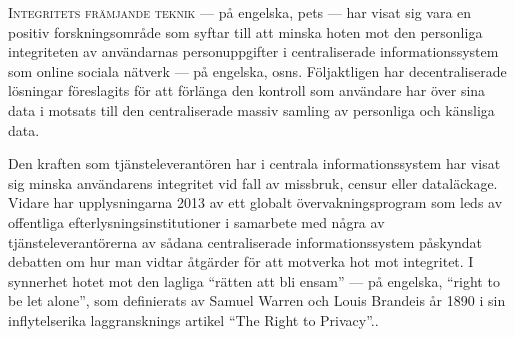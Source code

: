 


    {

    \lettrine{\textcolor[gray]{.25}{I}}{ntegritets främjande teknik}\csname@restorepar\endcsname\everypar{} 
    --- på engelska, \aclp*{pet} --- har visat sig vara en positiv forskningsområde 
    som syftar till att minska hoten mot den personliga integriteten av användarnas 
    personuppgifter i centraliserade informationssystem som online sociala nätverk 
    --- på engelska, \aclp*{osn}. Följaktligen har decentraliserade lösningar föreslagits 
    för att förlänga den kontroll som användare har över sina data i motsats till 
    den centraliserade massiv samling av personliga och känsliga data.\par
    }
    
    Den kraften som tjänsteleverantören har i centrala informationssystem har visat 
    sig minska användarens integritet vid fall av missbruk, censur eller dataläckage. 
    Vidare har upplysningarna 2013 av ett globalt övervakningsprogram som leds av 
    offentliga efterlysningsinstitutioner i samarbete med några av tjänsteleverantörerna 
    av sådana centraliserade informationssystem påskyndat debatten om hur man vidtar 
    åtgärder för att motverka hot mot integritet. I synnerhet hotet mot den lagliga 
    ``rätten att bli ensam'' --- på engelska, ``right to be let alone'', som definierats 
    av Samuel Warren och Louis Brandeis år 1890 i sin inflytelserika laggransknings 
    artikel ``The Right to Privacy''..
    
